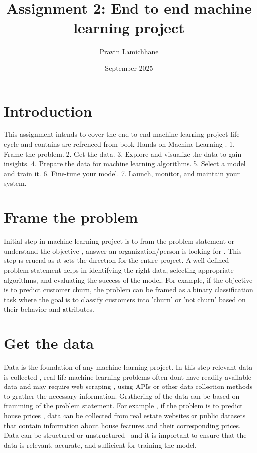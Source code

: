 \documentclass{article}
\begin{document}
\title{Assignment 2: End to end machine learning project}
\author{Pravin Lamichhane}
\date{September 2025}
\maketitle
\section{Introduction}
This assignment intends to cover the end to end machine learning project life cycle and contains are refrenced from book Hands on Machine Learning .
1. Frame the problem.
2. Get the data.
3. Explore and visualize the data to gain insights.
4. Prepare the data for machine learning algorithms.
5. Select a model and train it.
6. Fine-tune your model.
7. Launch, monitor, and maintain your system.

\section{Frame the problem}
Initial step in machine learning project is to fram the problem statement or understand the objective , answer an organization/person is looking for . This step is crucial as it sets the direction for the entire project. A well-defined problem statement helps in identifying the right data, selecting appropriate algorithms, and evaluating the success of the model. For example, if the objective is to predict customer churn, the problem can be framed as a binary classification task where the goal is to classify customers into 'churn' or 'not churn' based on their behavior and attributes.
\section{Get the data}
Data is the foundation of any machine learning project. In this step relevant data is collected , real life machine learning problems often dont have readily available data 
and may require web scraping , using APIs or other data collection methods to grather the necessary information. 
Grathering of the data can be based on framming of the problem statement. For example , if the problem is to predict house prices , data can be collected from real estate websites or public datasets that contain information about house features and their corresponding prices. 
Data can be structured or unstructured , and it is important to ensure that the data is relevant, accurate, and sufficient for training the model.
\end{document}
